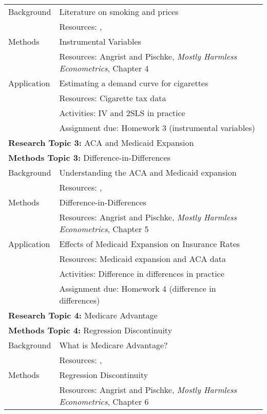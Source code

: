 \documentclass{article}
\begin{document}
\begin{longtable}{lp{13cm}}
  \hline\hline
  Background & Literature on smoking and prices\\
             & Resources: \cite{gruber2001}, \cite{ross2003} \\
  \hline
  Methods & Instrumental Variables \\
          & Resources: Angrist and Pischke, \textit{Mostly Harmless Econometrics}, Chapter 4 \\
  \hline
  Application & Estimating a demand curve for cigarettes \\
              & Resources: Cigarette tax data \\
              & Activities: IV and 2SLS in practice \citep{ross2003} \\
              & Assignment due: Homework 3 (instrumental variables) \\
  \hline
  \multicolumn{2}{l}{\textbf{Research Topic 3:} ACA and Medicaid Expansion} \\
  \multicolumn{2}{l}{\textbf{Methods Topic 3:} Difference-in-Differences} \\
  \hline\hline
  Background & Understanding the ACA and Medicaid expansion\\
             & Resources: \cite{obama2016}, \cite{courtemanche2017} \\
  \hline
  Methods & Difference-in-Differences \\
          & Resources: Angrist and Pischke, \textit{Mostly Harmless Econometrics}, Chapter 5 \\
  \hline
  Application & Effects of Medicaid Expansion on Insurance Rates \\
              & Resources: Medicaid expansion and ACA data \\
              & Activities: Difference in differences in practice \citep{courtemanche2017} \\
              & Assignment due: Homework 4 (difference in differences) \\
  \hline
  \multicolumn{2}{l}{\textbf{Research Topic 4:} Medicare Advantage} \\
  \multicolumn{2}{l}{\textbf{Methods Topic 4:} Regression Discontinuity} \\
  \hline\hline
  Background & What is Medicare Advantage? \\
             & Resources: \cite{darden2015}, \cite{gruber2017} \\
  \hline
  Methods & Regression Discontinuity \\
          & Resources: Angrist and Pischke, \textit{Mostly Harmless Econometrics}, Chapter 6 \\

\end{longtable}
\end{document}
